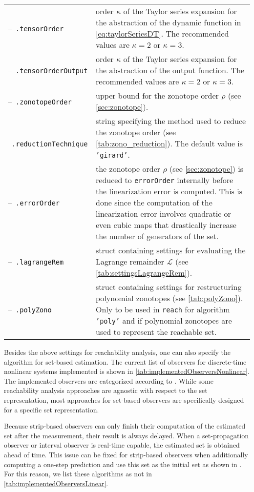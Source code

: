 \begin{center}
\renewcommand{\arraystretch}{1.3}
\begin{tabular}[t]{l p{10cm}}	
	--~\texttt{.tensorOrder} & order $\kappa$ of the Taylor series expansion for the abstraction of the dynamic function in \eqref{eq:taylorSeriesDT}. The recommended values are $\kappa = 2$ or $\kappa = 3$. \\
	--~\texttt{.tensorOrderOutput} & order $\kappa$ of the Taylor series expansion for the abstraction of the output function. The recommended values are $\kappa = 2$ or $\kappa = 3$. \\
	--~\texttt{.zonotopeOrder} & upper bound for the zonotope order $\rho$ (see \cref{sec:zonotope}). \\
	--~\texttt{.reductionTechnique} & string specifying the method used to reduce the zonotope order (see \cref{tab:zono_reduction}). The default value is \texttt{'girard'}. \\
	--~\texttt{.errorOrder} & the zonotope order $\rho$ (see \cref{sec:zonotope}) is reduced to \texttt{errorOrder} internally before the linearization error is computed. This is done since the computation of the linearization error involves quadratic or even cubic maps that drastically increase the number of generators of the set. \\
	--~\texttt{.lagrangeRem} & struct containing settings for evaluating the Lagrange remainder $\mathcal{L}$ (see \cref{tab:settingsLagrangeRem}). \\
	--~\texttt{.polyZono} & struct containing settings for restructuring polynomial zonotopes (see \cref{tab:polyZono}). Only to be used in \texttt{reach} for algorithm \texttt{'poly'} and if polynomial zonotopes are used to represent the reachable set.
\end{tabular}
\end{center}

Besides the above settings for reachability analysis, one can also specify the algorithm for set-based estimation. The current list of observers for discrete-time nonlinear systems implemented is shown in \cref{tab:implementedObserversNonlinear}. The implemented observers are categorized according to \cite{Althoff2021c,Althoff2021d}. While some reachability analysis approaches are agnostic with respect to the set representation, most approaches for set-based observers are specifically designed for a specific set representation.

Because strip-based observers can only finish their computation of the estimated set after the measurement, their result is always delayed. When a set-propagation observer or interval observer is real-time capable, the estimated set is obtained ahead of time. This issue can be fixed for strip-based observers when additionally computing a one-step prediction and use this set as the initial set as shown in \cite[Sec.~III]{Schuermann2018a}. For this reason, we list these algorithms as not  in \cref{tab:implementedObserversLinear}.

